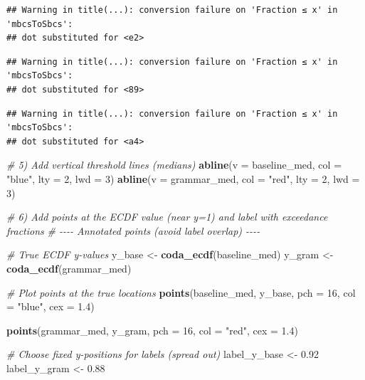 \documentclass[
]{article}
\newenvironment{Shaded}{\begin{snugshade}}{\end{snugshade}}
\newcommand{\AttributeTok}[1]{\textcolor[rgb]{0.13,0.29,0.53}{#1}}
\newcommand{\CommentTok}[1]{\textcolor[rgb]{0.56,0.35,0.01}{\textit{#1}}}
\newcommand{\DecValTok}[1]{\textcolor[rgb]{0.00,0.00,0.81}{#1}}
\newcommand{\FloatTok}[1]{\textcolor[rgb]{0.00,0.00,0.81}{#1}}
\newcommand{\FunctionTok}[1]{\textcolor[rgb]{0.13,0.29,0.53}{\textbf{#1}}}
\newcommand{\NormalTok}[1]{#1}
\newcommand{\OtherTok}[1]{\textcolor[rgb]{0.56,0.35,0.01}{#1}}
\newcommand{\StringTok}[1]{\textcolor[rgb]{0.31,0.60,0.02}{#1}}
\begin{document}
\begin{verbatim}
## Warning in title(...): conversion failure on 'Fraction ≤ x' in 'mbcsToSbcs':
## dot substituted for <e2>
\end{verbatim}

\begin{verbatim}
## Warning in title(...): conversion failure on 'Fraction ≤ x' in 'mbcsToSbcs':
## dot substituted for <89>
\end{verbatim}

\begin{verbatim}
## Warning in title(...): conversion failure on 'Fraction ≤ x' in 'mbcsToSbcs':
## dot substituted for <a4>
\end{verbatim}

\begin{Shaded}
\begin{Highlighting}[]
\CommentTok{\# 5) Add vertical threshold lines (medians)}
\FunctionTok{abline}\NormalTok{(}\AttributeTok{v =}\NormalTok{ baseline\_med, }\AttributeTok{col =} \StringTok{"blue"}\NormalTok{, }\AttributeTok{lty =} \DecValTok{2}\NormalTok{, }\AttributeTok{lwd =} \DecValTok{3}\NormalTok{)}
\FunctionTok{abline}\NormalTok{(}\AttributeTok{v =}\NormalTok{ grammar\_med,  }\AttributeTok{col =} \StringTok{"red"}\NormalTok{,  }\AttributeTok{lty =} \DecValTok{2}\NormalTok{, }\AttributeTok{lwd =} \DecValTok{3}\NormalTok{)}

\CommentTok{\# 6) Add points at the ECDF value (near y=1) and label with exceedance fractions}
\CommentTok{\# {-}{-}{-}{-} Annotated points (avoid label overlap) {-}{-}{-}{-}}

\CommentTok{\# True ECDF y{-}values}
\NormalTok{y\_base }\OtherTok{\textless{}{-}} \FunctionTok{coda\_ecdf}\NormalTok{(baseline\_med)}
\NormalTok{y\_gram }\OtherTok{\textless{}{-}} \FunctionTok{coda\_ecdf}\NormalTok{(grammar\_med)}

\CommentTok{\# Plot points at the true locations}
\FunctionTok{points}\NormalTok{(baseline\_med, y\_base,}
       \AttributeTok{pch =} \DecValTok{16}\NormalTok{, }\AttributeTok{col =} \StringTok{"blue"}\NormalTok{, }\AttributeTok{cex =} \FloatTok{1.4}\NormalTok{)}

\FunctionTok{points}\NormalTok{(grammar\_med, y\_gram,}
       \AttributeTok{pch =} \DecValTok{16}\NormalTok{, }\AttributeTok{col =} \StringTok{"red"}\NormalTok{, }\AttributeTok{cex =} \FloatTok{1.4}\NormalTok{)}

\CommentTok{\# Choose fixed y{-}positions for labels (spread out)}
\NormalTok{label\_y\_base }\OtherTok{\textless{}{-}} \FloatTok{0.92}
\NormalTok{label\_y\_gram }\OtherTok{\textless{}{-}} \FloatTok{0.88}


\end{Highlighting}
\end{Shaded}
\end{document}
